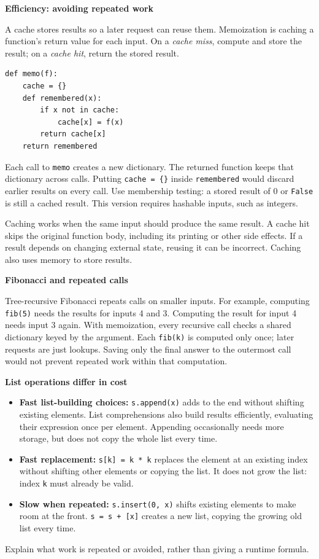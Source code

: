 \textbf{Efficiency: avoiding repeated work}

A cache stores results so a later request can reuse them. Memoization is
caching a function's return value for each input. On a \emph{cache miss},
compute and store the result; on a \emph{cache hit}, return the stored result.

\begin{lstlisting}
def memo(f):
    cache = {}
    def remembered(x):
        if x not in cache:
            cache[x] = f(x)
        return cache[x]
    return remembered
\end{lstlisting}

Each call to \lstinline{memo} creates a new dictionary. The returned function
keeps that dictionary across calls. Putting \lstinline|cache = {}| inside
\lstinline{remembered} would discard earlier results on every call.
Use membership testing: a stored result of 0 or \lstinline{False} is still
a cached result. This version requires hashable inputs, such as integers.

Caching works when the same input should produce the same result. A cache
hit skips the original function body, including its printing or other side
effects. If a result depends on changing external state, reusing it can be
incorrect. Caching also uses memory to store results.

\textbf{Fibonacci and repeated calls}

Tree-recursive Fibonacci repeats calls on smaller inputs.
For example, computing \lstinline{fib(5)} needs the results for inputs 4
and 3. Computing the result for input 4 needs input 3 again.
With memoization, every recursive call checks a shared dictionary keyed by
the argument. Each \lstinline{fib(k)} is computed only once; later requests
are just lookups. Saving only the final answer to the outermost call would
not prevent repeated work within that computation.

\textbf{List operations differ in cost}
\begin{itemize}
    \item \textbf{Fast list-building choices:} \lstinline{s.append(x)} adds
    to the end without shifting existing elements. List comprehensions also
    build results efficiently, evaluating their expression once per element.
    Appending occasionally needs more storage, but does not copy the whole
    list every time.
    \item \textbf{Fast replacement:} \lstinline{s[k] = k * k} replaces
    the element at an existing index without shifting other elements or
    copying the list. It does not grow the list: index \lstinline{k} must
    already be valid.
    \item \textbf{Slow when repeated:} \lstinline{s.insert(0, x)} shifts
    existing elements to make room at the front. \lstinline{s = s + [x]}
    creates a new list, copying the growing old list every time.
\end{itemize}
Explain what work is repeated or avoided, rather than giving a runtime formula.
